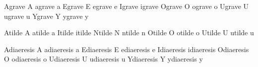  Agrave {\buildtextaccent\textgrave A} 
 agrave {\buildtextaccent\textgrave a}
 Egrave {\buildtextaccent\textgrave E}
 egrave {\buildtextaccent\textgrave e}
 Igrave {\buildtextaccent\textgrave \dotlessI}
 igrave {\buildtextaccent\textgrave \dotlessi}
 Ograve {\buildtextaccent\textgrave O}
 ograve {\buildtextaccent\textgrave o}
 Ugrave {\buildtextaccent\textgrave U}
 ugrave {\buildtextaccent\textgrave u}
 Ygrave {\buildtextaccent\textgrave Y} 
 ygrave {\buildtextaccent\textgrave y}     

 Atilde {\buildtextaccent\texttilde A}
 atilde {\buildtextaccent\texttilde a}
 Itilde {\buildtextaccent\texttilde \dotlessI}
 itilde {\buildtextaccent\texttilde \dotlessi}
 Ntilde {\buildtextaccent\texttilde N}
 ntilde {\buildtextaccent\texttilde n}
 Otilde {\buildtextaccent\texttilde O}
 otilde {\buildtextaccent\texttilde o}
 Utilde {\buildtextaccent\texttilde U}
 utilde {\buildtextaccent\texttilde u}

 Adiaeresis {\buildtextaccent\textdiaeresis A}
 adiaeresis {\buildtextaccent\textdiaeresis a}
 Ediaeresis {\buildtextaccent\textdiaeresis E}
 ediaeresis {\buildtextaccent\textdiaeresis e}
 Idiaeresis {\buildtextaccent\textdiaeresis \dotlessI}
 idiaeresis {\buildtextaccent\textdiaeresis \dotlessi}
 Odiaeresis {\buildtextaccent\textdiaeresis O}
 odiaeresis {\buildtextaccent\textdiaeresis o}
 Udiaeresis {\buildtextaccent\textdiaeresis U}
 udiaeresis {\buildtextaccent\textdiaeresis u}
 Ydiaeresis {\buildtextaccent\textdiaeresis Y}
 ydiaeresis {\buildtextaccent\textdiaeresis y}

